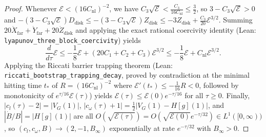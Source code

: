 \documentclass[11pt,a4paper]{article}
\begin{document}
\begin{proof}
Whenever $\mathcal{E} < (16 C_{\mathrm{nl}})^{-2}$, we have $C_3\sqrt{\mathcal{E}} < \frac{C_3}{16 C_{\mathrm{nl}}} \le \frac{3}{2}$,
so $3 - C_3\sqrt{\mathcal{E}} > 0$ and $-(3 - C_3\sqrt{\mathcal{E}})D_{\mathrm{disk}} \le -(3 - C_3\sqrt{\mathcal{E}})Z_{\mathrm{disk}} \le -3 Z_{\mathrm{disk}} + \frac{C_3}{20}\mathcal{E}^{3/2}$.
Summing $20\dot{X}_{\mathrm{far}} + \dot{Y}_{\mathrm{far}} + 20\dot{Z}_{\mathrm{disk}}$ and applying the exact rational
coercivity identity (Lean: \texttt{lyapunov\_three\_block\_coercivity}) yields
\[
\frac{d}{d\tau}\mathcal{E} \le -\frac{1}{8}\mathcal{E} + (20 C_1 + C_2 + C_3)\mathcal{E}^{3/2} \le -\frac{1}{8}\mathcal{E} + C_{\mathrm{nl}}\mathcal{E}^{3/2}.
\]
Applying the Riccati barrier trapping theorem (Lean: \texttt{riccati\_bootstrap\_trapping\_decay},
proved by contradiction at the minimal hitting time $t_*$ of $R=(16 C_{\mathrm{nl}})^{-2}$ where $\mathcal{E}'(t_*)\le -\frac{1}{16}R<0$,
followed by monotonicity of $e^{\tau/16}\mathcal{E}(\tau)$) yields $\mathcal{E}(\tau)\le\mathcal{E}(0)e^{-\tau/16}$ for all $\tau\ge 0$.
Finally, $|c_l(\tau)-2|=|V_G(1)|$, $|c_\omega(\tau)+1|=\frac{1}{2}|V_G(1)-H[g](1)|$, and $|\dot{B}/B|=|H[g](1)|$
are all $O(\sqrt{\mathcal{E}(\tau)})=O(\sqrt{\mathcal{E}(0)}e^{-\tau/32})\in L^1([0,\infty))$, so $(c_l,c_\omega,B)\to(2,-1,B_\infty)$
exponentially at rate $e^{-\tau/32}$ with $B_\infty>0$.
\end{proof}
\end{document}

